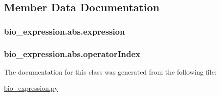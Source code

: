 \subsection{Member Data Documentation}
\hypertarget{classbio__expression_1_1abs_af74ad5264822b73581b7ead7fbe46768}{
\subsubsection[{expression}]{\setlength{\rightskip}{0pt plus 5cm}bio\+\_\+expression.\+abs.\+expression}}\label{classbio__expression_1_1abs_af74ad5264822b73581b7ead7fbe46768}
\hypertarget{classbio__expression_1_1abs_a865d909c93911c8d51db150d4aa9e727}{
\subsubsection[{operator\+Index}]{\setlength{\rightskip}{0pt plus 5cm}bio\+\_\+expression.\+abs.\+operator\+Index}}\label{classbio__expression_1_1abs_a865d909c93911c8d51db150d4aa9e727}


The documentation for this class was generated from the following file\+:\begin{DoxyCompactItemize}
\item 
\hyperlink{bio__expression_8py}{bio\+\_\+expression.\+py}\end{DoxyCompactItemize}
